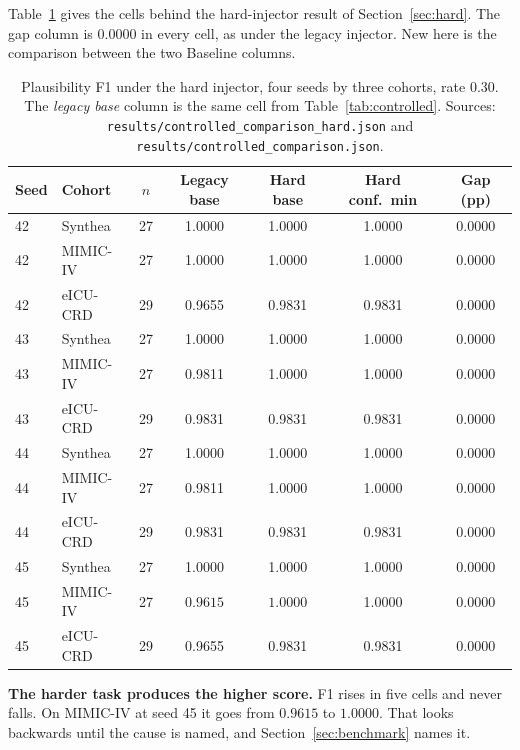 Table~\ref{tab:hardcells} gives the cells behind the hard-injector result of Section~\ref{sec:hard}.
The gap column is $0.0000$ in every cell, as under the legacy injector. New here is the comparison
between the two Baseline columns.

\begin{table}[!ht]
\centering
{}
\caption{Plausibility F1 under the hard injector, four seeds by three cohorts, rate 0.30. The
\emph{legacy base} column is the same cell from Table~\ref{tab:controlled}. Sources:
\texttt{results/controlled\_comparison\_hard.json} and \texttt{results/controlled\_comparison.json}.}
\label{tab:hardcells}
\begin{tabular}{llccccc}
\toprule
Seed & Cohort & $n$ & Legacy base & Hard base & Hard conf.\ min & Gap (pp) \\
\midrule
42 & Synthea  & 27 & 1.0000 & 1.0000 & 1.0000 & 0.0000 \\
42 & MIMIC-IV & 27 & 1.0000 & 1.0000 & 1.0000 & 0.0000 \\
42 & eICU-CRD & 29 & 0.9655 & 0.9831 & 0.9831 & 0.0000 \\
43 & Synthea  & 27 & 1.0000 & 1.0000 & 1.0000 & 0.0000 \\
43 & MIMIC-IV & 27 & 0.9811 & 1.0000 & 1.0000 & 0.0000 \\
43 & eICU-CRD & 29 & 0.9831 & 0.9831 & 0.9831 & 0.0000 \\
44 & Synthea  & 27 & 1.0000 & 1.0000 & 1.0000 & 0.0000 \\
44 & MIMIC-IV & 27 & 0.9811 & 1.0000 & 1.0000 & 0.0000 \\
44 & eICU-CRD & 29 & 0.9831 & 0.9831 & 0.9831 & 0.0000 \\
45 & Synthea  & 27 & 1.0000 & 1.0000 & 1.0000 & 0.0000 \\
45 & MIMIC-IV & 27 & $\mathbf{0.9615}$ & $\mathbf{1.0000}$ & 1.0000 & 0.0000 \\
45 & eICU-CRD & 29 & 0.9655 & 0.9831 & 0.9831 & 0.0000 \\
\bottomrule
\end{tabular}
\end{table}

\textbf{The harder task produces the higher score.} F1 rises in five cells and never falls. On
MIMIC-IV at seed 45 it goes from $0.9615$ to $1.0000$. That looks backwards until the cause is named,
and Section~\ref{sec:benchmark} names it.

